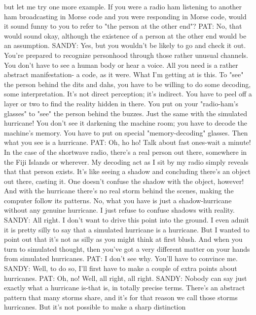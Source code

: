    but let me try one more example. If you were a radio ham listening to another
   ham broadcasting in Morse code and you were responding in Morse code, would
   it sound funny to you to refer to "the person at the other end"?
PAT: No, that would sound okay, although the existence of a person at the other end
   would be an assumption.
SANDY: Yes, but you wouldn't be likely to go and check it out. You're prepared to
   recognize personhood through those rather unusual channels. You don't have to
   see a human body or hear a voice. All you need is a rather abstract manifestation-
   a code, as it were. What I'm getting at is this. To "see" the person behind the dits
   and dahs, you have to be willing to do some decoding, some interpretation. It's
   not direct perception; it's indirect. You have to peel off a layer or two to find the
   reality hidden in there. You put on your "radio-ham's glasses" to "see" the person
   behind the buzzes. Just the same with the simulated hurricane! You don't see it
   darkening the machine room; you have to decode the machine's memory. You
   have to put on special "memory-decoding" glasses. Then what you see is a
   hurricane.
PAT: Oh, ho ho! Talk about fast ones-wait a minute! In the case of the shortwave
   radio, there's a real person out there, somewhere in the Fiji Islands or wherever.
   My decoding act as I sit by my radio simply reveals that that person exists. It's
   like seeing a shadow and concluding there's an object out there, casting it. One
   doesn't confuse the shadow with the object, however! And with the hurricane
   there's no real storm behind the scenes, making the computer follow its patterns.
   No, what you have is just a shadow-hurricane without any genuine hurricane. I
   just refuse to confuse shadows with reality.
SANDY: All right. I don't want to drive this point into the ground. I even admit it is
   pretty silly to say that a simulated hurricane is a hurricane. But I wanted to point
   out that it's not as silly as you might think at first blush. And when you turn to
   simulated thought, then you've got a very different matter on your hands from
   simulated hurricanes.
PAT: I don't see why. You'll have to convince me.
SANDY: Well, to do so, I'll first have to make a couple of extra points about
   hurricanes.
PAT: Oh, no! Well, all right, all right.
SANDY: Nobody can say just exactly what a hurricane is-that is, in totally precise
   terms. There's an abstract pattern that many storms share, and it's for that reason
   we call those storms hurricanes. But it's not possible to make a sharp distinction

